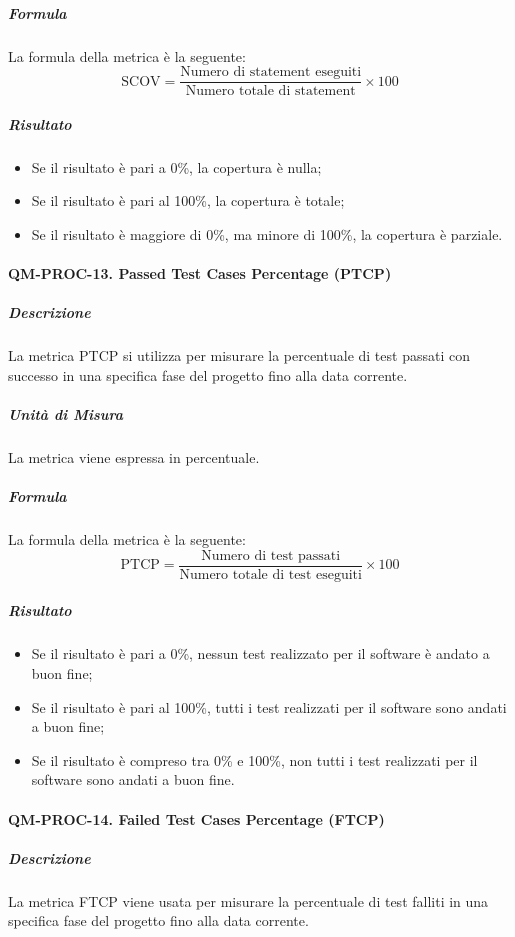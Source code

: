 			\subparagraph{Formula}
			La formula della metrica è la seguente:
			\[
				\text{SCOV} = \frac{\text{Numero di statement eseguiti}}{\text{Numero totale di statement}} \times 100
			\]

			\subparagraph{Risultato}
			\begin{itemize}
				\item Se il risultato è pari a 0\%, la copertura è nulla;
				\item Se il risultato è pari al 100\%, la copertura è totale;
				\item Se il risultato è maggiore di 0\%, ma minore di 100\%, la copertura è parziale.
			\end{itemize}

		\paragraph{QM-PROC-13. Passed Test Cases Percentage (PTCP)}

			\subparagraph{Descrizione}
			La metrica PTCP si utilizza per misurare la percentuale di test passati con successo in una specifica fase del progetto fino alla data corrente.

			\subparagraph{Unità di Misura}
			La metrica viene espressa in percentuale.

			\subparagraph{Formula}
			La formula della metrica è la seguente:
			\[
				\text{PTCP} = \frac{\text{Numero di test passati}}{\text{Numero totale di test eseguiti}} \times 100
			\]

			\subparagraph{Risultato}
			\begin{itemize}
				\item Se il risultato è pari a 0\%, nessun test realizzato per il software è andato a buon fine;
				\item Se il risultato è pari al 100\%, tutti i test realizzati per il software sono andati a buon fine;
				\item Se il risultato è compreso tra 0\% e 100\%, non tutti i test realizzati per il software sono andati a buon fine.
			\end{itemize}

		\paragraph{QM-PROC-14. Failed Test Cases Percentage (FTCP)}

			\subparagraph{Descrizione}
			La metrica FTCP viene usata per misurare la percentuale di test falliti in una specifica fase del progetto fino alla data corrente.

